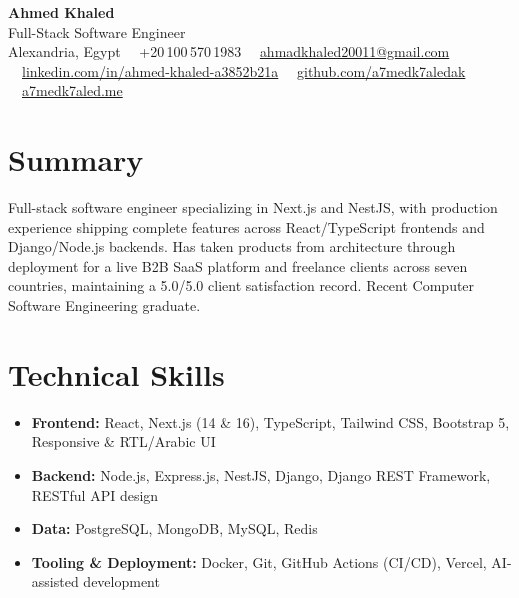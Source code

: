 \documentclass[10pt,letterpaper]{article}
\newcommand{\sectionrule}{\vspace{-1pt}{\color{hairline}\hrule height 0.6pt}\vspace{2pt}}
\begin{document}
\begin{center}
    {\fontsize{20}{22}\selectfont\textbf{Ahmed Khaled}}\\[1pt]
    {\color{accent}\fontsize{10}{11}\selectfont Full-Stack Software Engineer}\\[2pt]
    {\footnotesize\color{muted}
      Alexandria, Egypt \ \textperiodcentered\ +20\,100\,570\,1983 \ \textperiodcentered\
      \href{mailto:ahmadkhaled20011@gmail.com}{ahmadkhaled20011@gmail.com} \ \textperiodcentered\
      \href{https://www.linkedin.com/in/ahmed-khaled-a3852b21a/}{linkedin.com/in/ahmed-khaled-a3852b21a} \ \textperiodcentered\
      \href{https://github.com/a7medk7aledak}{github.com/a7medk7aledak} \ \textperiodcentered\
      \href{https://a7medk7aled.me}{a7medk7aled.me}
    }
\end{center}

\section*{Summary}
\sectionrule
{\small
Full-stack software engineer specializing in Next.js and NestJS, with production experience shipping complete
features across React/TypeScript frontends and Django/Node.js backends. Has taken products from architecture
through deployment for a live B2B SaaS platform and freelance clients across seven countries, maintaining a
5.0/5.0 client satisfaction record. Recent Computer Software Engineering graduate.
}

\section*{Technical Skills}
\sectionrule
{\small
\begin{itemize}
    \item \textbf{Frontend:} React, Next.js (14 \& 16), TypeScript, Tailwind CSS, Bootstrap 5, Responsive \& RTL/Arabic UI
    \item \textbf{Backend:} Node.js, Express.js, NestJS, Django, Django REST Framework, RESTful API design
    \item \textbf{Data:} PostgreSQL, MongoDB, MySQL, Redis
    \item \textbf{Tooling \& Deployment:} Docker, Git, GitHub Actions (CI/CD), Vercel, AI-assisted development
\end{itemize}
}
\end{document}
